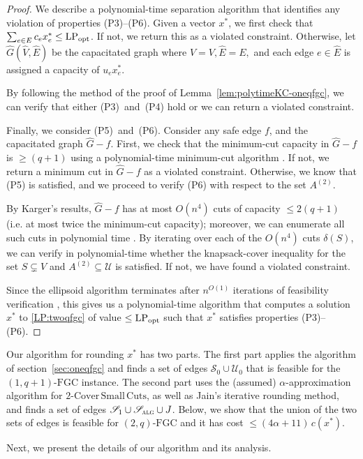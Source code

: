 \documentclass[11pt]{article}
\newcommand\lpopt{\hbox{\text{LP}$_{\text{opt}}$}}
\newcommand{\safe}{\mathscr{S}}
\newcommand{\unsafe}{\mathscr{U}}
\newcommand{\fgc}{\mathrm{FGC}}
\newcommand{\oneqplusfgc}{(1,q+1)\text{-}\fgc}
\newcommand{\J}{{J}}
\newcommand{\alg}{\textsc{alg}}
\newcommand{\twoqfgc}{(2,q)\text{-}\fgc}
\newcommand\hG{\hat{G}}
\newcommand\hE{\hat{E}}
\newcommand\hV{\hat{V}}
\newcommand\twoASC{\mathrm{2\text{-}Cover\,Small\,Cuts}}
\begin{document}
{{{\begin{proof}
We describe a polynomial-time separation algorithm that identifies
any violation of properties (P3)--(P6). Given a vector $x^*$, we
first check that $\sum_{e \in E} c_e x^*_e \le \lpopt$. If not, we
return this as a violated constraint. Otherwise, let $\hG(\hV,\hE)$
be the capacitated graph where $\hV=V, \hE=E,$ and each edge $e\in\hE$
is assigned a capacity of $u_ex_e^*$.

By following the method of the proof of Lemma~\ref{lem:polytimeKC-oneqfgc},
we can verify that either (P3)~and~(P4) hold or we can return a violated constraint.

Finally, we consider (P5)~and~(P6).
Consider any safe edge $f$, and the capacitated graph $\hG-f$.
First, we check that the minimum-cut capacity in $\hG-f$ is $\geq(q+1)$
using a polynomial-time minimum-cut algorithm \cite{Schrijver-book}.
If not, we return a minimum cut in $\hG-f$ as a violated constraint.
Otherwise, we know that (P5) is satisfied, and we proceed to verify
(P6) with respect to the set  $A^{(2)}$.

By Karger's results, $\hG-f$ has at most $O(n^4)$ cuts of capacity
$\leq2(q+1)$ (i.e. at most twice the minimum-cut capacity); moreover,
we can enumerate all such cuts in polynomial time \cite{NNI97}.  By
iterating over each of the $O(n^4)$ cuts $\delta(S)$, we can verify
in polynomial-time whether the knapsack-cover inequality for the
set $S\subsetneq{V}$ and $A^{(2)}\subseteq\unsafe$ is satisfied.
If not, we have found a violated constraint.

Since the ellipsoid algorithm terminates after $n^{O(1)}$ iterations
of feasibility verification \cite{ellipsoid-book}, this gives us a
polynomial-time algorithm that computes a solution $x^*$ to
\eqref{LP:twoqfgc} of value $\leq\lpopt$ such that $x^*$ satisfies
properties (P3)--(P6).
\end{proof}
}


Our algorithm for rounding $x^*$ has two parts.
The first part applies the algorithm of section~\ref{sec:oneqfgc}
and finds a set of edges $\safe_0\cup\unsafe_0$ that is feasible
for the $\oneqplusfgc$ instance.
The second part uses the (assumed) $\alpha$-approximation algorithm
for $\twoASC$, as well as Jain's iterative rounding method, and finds
a set of edges $\safe_1\cup\safe_{\alg}\cup{\J}$.
Below, we show that the union of the two sets of edges is feasible
for $\twoqfgc$ and it has cost $\leq(4 \alpha + 11)\,c(x^*)$.

Next, we present the details of our algorithm and its analysis.

}}
\end{document}
